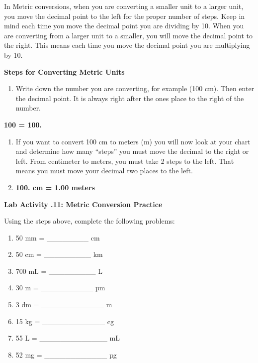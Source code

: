 \documentclass[
  letterpaper,
  DIV=11,
  numbers=noendperiod]{scrreprt}
\providecommand{\tightlist}{%
  \setlength{\itemsep}{0pt}\setlength{\parskip}{0pt}}
\begin{document}
In Metric conversions, when you are converting a smaller unit to a
larger unit, you move the decimal point to the left for the proper
number of steps. Keep in mind each time you move the decimal point you
are dividing by 10. When you are converting from a larger unit to a
smaller, you will move the decimal point to the right. This means each
time you move the decimal point you are multiplying by 10.

\textbf{Steps for Converting Metric Units}

\begin{enumerate}
\def\labelenumi{\arabic{enumi}.}
\tightlist
\item
  Write down the number you are converting, for example (100 cm). Then
  enter the decimal point. It is always right after the ones place to
  the right of the number.
\end{enumerate}

\textbf{100 = 100.}

\begin{enumerate}
\def\labelenumi{\arabic{enumi}.}
\setcounter{enumi}{1}
\item
  If you want to convert 100 cm to meters (m) you will now look at your
  chart and determine how many ``steps'' you must move the decimal to
  the right or left. From centimeter to meters, you must take 2 steps to
  the left. That means you must move your decimal two places to the
  left.
\item
  \textbf{100. cm = 1.00 meters}
\end{enumerate}

\textbf{Lab Activity .11: Metric Conversion Practice}

Using the steps above, complete the following problems:

\begin{enumerate}
\def\labelenumi{\arabic{enumi}.}
\item
  50 mm = \_\_\_\_\_\_\_\_ cm
\item
  50 cm = \_\_\_\_\_\_\_\_\_ km
\item
  700 mL = \_\_\_\_\_\_\_\_\_ L
\item
  30 m = \_\_\_\_\_\_\_\_\_\_ µm
\item
  3 dm = \_\_\_\_\_\_\_\_\_\_\_\_ m
\item
  15 kg = \_\_\_\_\_\_\_\_\_\_\_\_ cg
\item
  55 L = \_\_\_\_\_\_\_\_\_\_\_\_\_ mL
\item
  52 mg = \_\_\_\_\_\_\_\_\_\_\_\_ µg
\end{enumerate}
\end{document}
